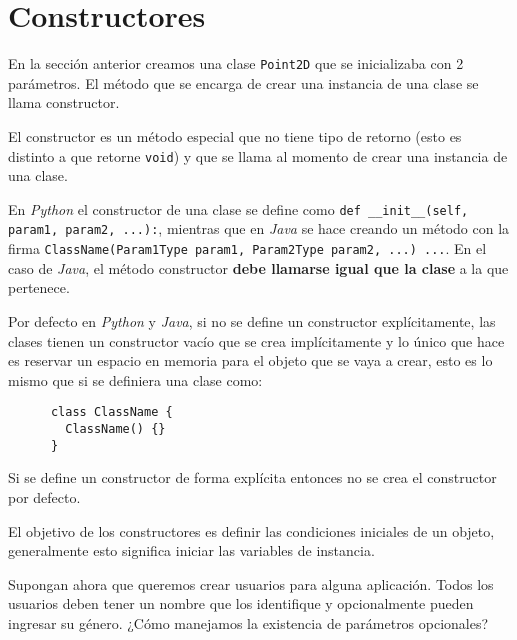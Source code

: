 \section{Constructores}
  
  En la sección anterior creamos una clase \texttt{Point2D} que se inicializaba con 2 
  parámetros.
  El método que se encarga de crear una instancia de una clase se llama constructor.

  El constructor es un método especial que no tiene tipo de retorno (esto es distinto a 
  que retorne \texttt{void}) y que se llama al momento de crear una instancia de
  una clase.

  En \textit{Python} el constructor de una clase se define como 
  \texttt{def __init__(self, param1, param2, ...):}, mientras que en 
  \textit{Java} se hace creando un método con la firma 
  \texttt{ClassName(Param1Type param1, Param2Type param2, ...) {...}}.
  En el caso de \textit{Java}, el método constructor \textbf{debe llamarse igual que la 
  clase} a la que pertenece.

  Por defecto en \textit{Python} y \textit{Java}, si no se define un constructor 
  explícitamente, las clases tienen un constructor vacío que se crea implícitamente y lo 
  único que hace es reservar un espacio en memoria para el objeto que se vaya a crear, 
  esto es lo mismo que si se definiera una clase como:

  \begin{listing}[ht!]
    \begin{verbatim}
      class ClassName {
        ClassName() {}
      }
    \end{verbatim}
  \end{listing}

  \begin{important}
    Si se define un constructor de forma explícita entonces no se crea el constructor por 
    defecto.
  \end{important}

  El objetivo de los constructores es definir las condiciones iniciales de un objeto, 
  generalmente esto significa iniciar las variables de instancia.

  Supongan ahora que queremos crear usuarios para alguna aplicación.
  Todos los usuarios deben tener un nombre que los identifique y opcionalmente pueden 
  ingresar su género.
  ¿Cómo manejamos la existencia de parámetros opcionales?

